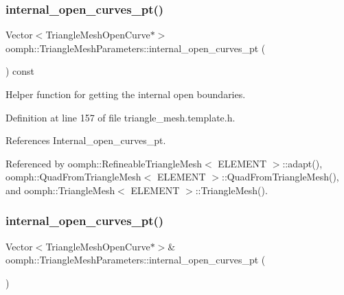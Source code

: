 \subsubsection{\texorpdfstring{internal\+\_\+open\+\_\+curves\+\_\+pt()}{internal\_open\_curves\_pt()}\hspace{0.1cm}{\footnotesize\ttfamily [1/2]}}
{\footnotesize\ttfamily Vector$<$Triangle\+Mesh\+Open\+Curve$\ast$$>$ oomph\+::\+Triangle\+Mesh\+Parameters\+::internal\+\_\+open\+\_\+curves\+\_\+pt (\begin{DoxyParamCaption}{ }\end{DoxyParamCaption}) const\hspace{0.3cm}{\ttfamily [inline]}}



Helper function for getting the internal open boundaries. 



Definition at line 157 of file triangle\+\_\+mesh.\+template.\+h.



References Internal\+\_\+open\+\_\+curves\+\_\+pt.



Referenced by oomph\+::\+Refineable\+Triangle\+Mesh$<$ E\+L\+E\+M\+E\+N\+T $>$\+::adapt(), oomph\+::\+Quad\+From\+Triangle\+Mesh$<$ E\+L\+E\+M\+E\+N\+T $>$\+::\+Quad\+From\+Triangle\+Mesh(), and oomph\+::\+Triangle\+Mesh$<$ E\+L\+E\+M\+E\+N\+T $>$\+::\+Triangle\+Mesh().

\mbox{\label{classoomph_1_1TriangleMeshParameters_aa25edb5250e94e966622ae4c460f996b}} 
\subsubsection{\texorpdfstring{internal\+\_\+open\+\_\+curves\+\_\+pt()}{internal\_open\_curves\_pt()}\hspace{0.1cm}{\footnotesize\ttfamily [2/2]}}
{\footnotesize\ttfamily Vector$<$Triangle\+Mesh\+Open\+Curve$\ast$$>$\& oomph\+::\+Triangle\+Mesh\+Parameters\+::internal\+\_\+open\+\_\+curves\+\_\+pt (\begin{DoxyParamCaption}{ }\end{DoxyParamCaption})\hspace{0.3cm}{\ttfamily [inline]}}



